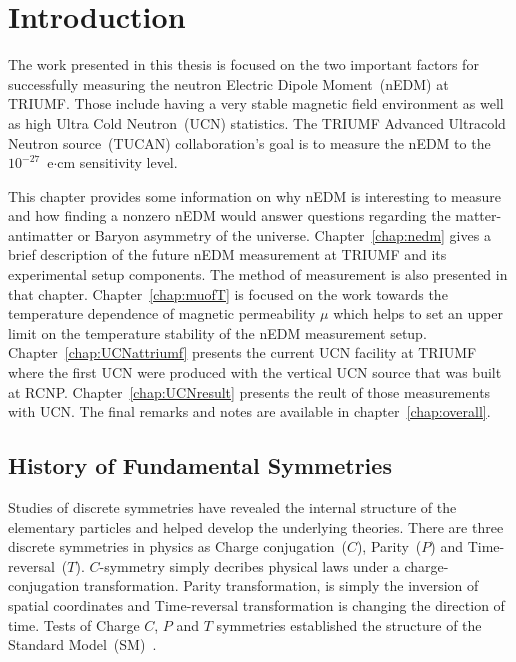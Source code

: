 \chapter{Introduction\label{chap:intro}}
\renewcommand{\thepage}{\arabic{page}}%
\setcounter{page}{1}%



The work presented in this thesis is focused on the two important
factors for successfully measuring the neutron Electric Dipole
Moment~(nEDM) at TRIUMF. Those include having a very stable magnetic
field environment as well as high Ultra Cold Neutron~(UCN)
statistics. The TRIUMF Advanced Ultracold Neutron source~(TUCAN)
collaboration's goal is to measure the nEDM to the
$10^{-27}$~e$\cdot$cm sensitivity level.


This chapter provides some information on why nEDM is interesting to
measure and how finding a nonzero nEDM would answer questions
regarding the matter-antimatter or Baryon asymmetry of the
universe. Chapter~\ref{chap:nedm} gives a brief description of the
future nEDM measurement at TRIUMF and its experimental setup
components. The method of measurement is also presented in that
chapter. Chapter~\ref{chap:muofT} is focused on the work towards the
temperature dependence of magnetic permeability $\mu$ which helps to
set an upper limit on the temperature stability of the nEDM
measurement setup. Chapter~\ref{chap:UCNattriumf} presents the current
UCN facility at TRIUMF where the first UCN were produced with the
vertical UCN source that was built at
RCNP. Chapter~\ref{chap:UCNresult} presents the reult of those
measurements with UCN. The final remarks and notes are available in
chapter~\ref{chap:overall}.



\section{History of Fundamental Symmetries }

Studies of discrete symmetries have revealed the
internal structure of the elementary particles and helped develop the
underlying theories.
There are three discrete symmetries in physics as Charge
conjugation~($C$), Parity~($P$) and Time-reversal~($T$). $C$-symmetry
simply decribes physical laws under a charge-conjugation
transformation. Parity transformation, is simply the inversion of
spatial coordinates and Time-reversal transformation is changing the
direction of time.  Tests of Charge $C$, $P$ and $T$ symmetries
established the structure
of the Standard Model~(SM)~\cite{pospelov2005electric}.

